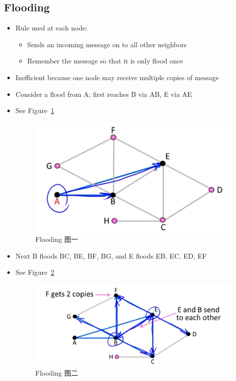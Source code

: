 \documentclass[12pt]{ctexart}   %
\begin{document}
	\subsection{Flooding}
	\begin{itemize}
		\item Rule used at each node:
		\begin{itemize}
			\item Sends an incoming message on to all other neighbors
			\item Remember the message so that it is only flood once
		\end{itemize}
		
		\item Inefficient because one node may receive multiple copies of message
		
		\item Consider a flood from A; first reaches B via AB, E via AE
		\item See Figure~\ref{fig:5-5-2}
			
		\begin{figure}[h!] %
		\centering
		 \includegraphics[scale=0.7]{images/5-5-2}
		\caption{ Flooding 图一 }
		 \label{fig:5-5-2}
		 \end{figure}
		
		\item Next B floods BC, BE, BF, BG, and E floods EB, EC, ED, EF
		\item See Figure~\ref{fig:5-5-3}
			
		\begin{figure}[h!] %
		\centering
		 \includegraphics[scale=0.7]{images/5-5-3}
		\caption{ Flooding 图二 }
		 \label{fig:5-5-3}
		 \end{figure}
		 

\end{itemize}
\end{document}
